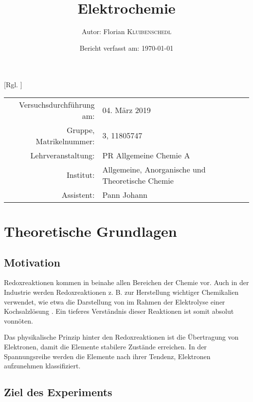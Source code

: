 \documentclass{article}
\title{Elektrochemie \cite{Versuchsvorschrift}} %
\author{Autor: Florian \textsc{Kluibenschedl}} %
\date{Bericht verfasst am: \today} %
\begin{document}
  [Rgl. ]{}{}
  
  \maketitle %
  
  \begin{center}
    \begin{tabular}{r p{4cm}}
      Versuchsdurchführung am: & 04. März 2019\\ %
      Gruppe, Matrikelnummer: & 3, 11805747 \\
      Lehrveranstaltung: & PR Allgemeine Chemie A \\
      Institut: & Allgemeine, Anorganische und Theoretische Chemie \\
      Assistent: & Pann Johann %
    \end{tabular}
  \end{center}


  \begin{abstract}
    
  \end{abstract}
  
  \section{Theoretische Grundlagen}
  
    \subsection{Motivation} \label{sec:Motivation}
      
      Redoxreaktionen kommen in beinahe allen Bereichen der Chemie vor. Auch in der Industrie werden Redoxreaktionen z. B. zur Herstellung wichtiger Chemikalien verwendet, wie etwa die Darstellung von  im Rahmen der Elektrolyse einer Kochsalzlösung \cite{NaOHDarstellung}. Ein tieferes Verständnis dieser Reaktionen ist somit absolut vonnöten. 
      
      Das physikalische Prinzip hinter den Redoxreaktionen ist die Übertragung von Elektronen, damit die Elemente stabilere Zustände erreichen. In der Spannungsreihe werden die Elemente nach ihrer Tendenz, Elektronen aufzunehmen klassifiziert. 
  
    \subsection{Ziel des Experiments}
    
\end{document}
